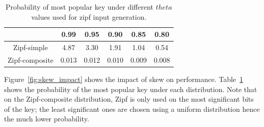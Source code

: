 \begin{table}
\begin{center}
\begin{tabular}{|c|c|c|c|c|c|}
	\hline 
	& 0.99 & 0.95 & 0.90 & 0.85 & 0.80 \\ 
	\hline 
	Zipf-simple & 4.87 & 3.30 & 1.91 & 1.04 & 0.54 \\ 
	\hline 
	Zipf-composite & 0.013 & 0.012 & 0.010 & 0.009 & 0.008 \\ 
	\hline 
\end{tabular} 
\end{center}
\caption{Probability of most popular key under different $theta$ values used for zipf input generation.}
\label{table:theta}
\end{table} 

Figure~\ref{fig:skew_impact} shows the impact of skew on performance. Table~\ref{table:theta} shows the probability of the most popular key under each distribution. Note that on the Zipf-composite distribution, Zipf is only used on the most significant bits of the key; the least significant ones are chosen using a uniform distribution hence the much lower probability.
